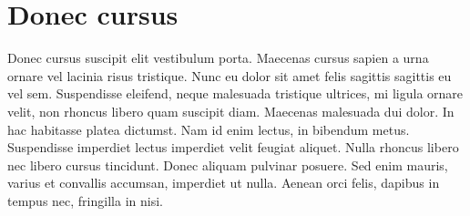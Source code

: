 \section{Donec cursus}

Donec cursus suscipit elit vestibulum porta. Maecenas cursus sapien a urna ornare vel lacinia risus tristique. Nunc eu dolor sit amet felis sagittis sagittis eu vel sem. Suspendisse eleifend, neque malesuada tristique ultrices, mi ligula ornare velit, non rhoncus libero quam suscipit diam. Maecenas malesuada dui dolor. In hac habitasse platea dictumst. Nam id enim lectus, in bibendum metus. Suspendisse imperdiet lectus imperdiet velit feugiat aliquet. Nulla rhoncus libero nec libero cursus tincidunt. Donec aliquam pulvinar posuere. Sed enim mauris, varius et convallis accumsan, imperdiet ut nulla. Aenean orci felis, dapibus in tempus nec, fringilla in nisi. 

\providecommand{\mcol}[2]{\multicolumn{#1}{c}{#2}}
\providecommand{\mcoll}[2]{\multicolumn{#1}{@{}l@{}}{#2}}

\providecommand{\emptycell}{\mcol{3}{---}}
\providecommand{\minussign}{-}

\providecommand{\tabval}[3]{#1.&#2 & ± #3}
\providecommand{\tabvalb}[4]{#1.&#2&\makebox[0pt][l]{\tsub{$-$#3}}\tsup{+#4}}

